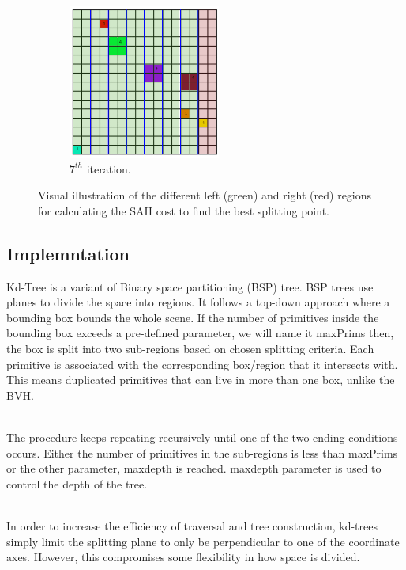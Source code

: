 \documentclass[11pt,a4paper]{article}
\begin{document}
\begin{figure}[H]
\begin{subfigure}[b]{0.475\textwidth}
         \centering
         \includegraphics[width=5cm]{images/kdtree/grid_8.png}
         \caption{$7^{th} $ iteration.}
         \label{fig:pi_18000}
     \end{subfigure}
        \captionsetup{justification=centering,margin=2cm}
        \caption{Visual illustration of the different left (green) and right (red) regions for calculating the SAH cost to find the best splitting point. }
        \label{fig:three graphs}
\end{figure}



\subsection{Implemntation}

Kd-Tree is a variant of Binary space partitioning (BSP) tree. BSP trees use planes to divide the space into regions. It follows a top-down approach where a bounding box bounds the whole scene. If the number of primitives inside the bounding box exceeds a pre-defined parameter, we will name it maxPrims then, the box is split into two sub-regions based on chosen splitting criteria. Each primitive is associated with the corresponding box/region that it intersects with. This means duplicated primitives that can live in more than one box, unlike the BVH.

\noindent
\\
The procedure keeps repeating recursively until one of the two ending conditions occurs. Either the number of primitives in the sub-regions is less than maxPrims or the other parameter, maxdepth is reached. maxdepth parameter is used to control the depth of the tree. 

\noindent
\\
In order to increase the efficiency of traversal and tree construction, kd-trees simply limit the splitting plane to only be perpendicular to one of the coordinate axes. However, this compromises some flexibility in how space is divided.
\end{document}
